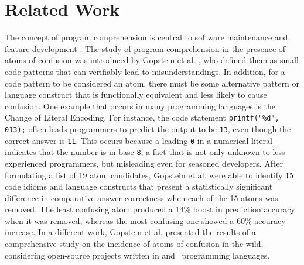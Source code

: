 
\section{Related Work}

\label{back}

The concept of program comprehension is central to software maintenance and feature development \cite{DBLP:conf/iwpc/TilleySP96, DBLP:journals/ibmsj/OHareT94}. The study of program comprehension in the presence of atoms of confusion was introduced by Gopstein et al. \cite{DBLP:conf/msr/GopsteinZFC18}, who defined them as small code patterns that can verifiably lead to misunderstandings. In addition, for a code pattern to be considered an atom, there must be some alternative pattern or language construct that is functionally equivalent and less likely to cause confusion. One example that occurs in many programming languages is the Change of Literal Encoding. For instance, the \clang code statement \lstinline{printf("%d", 013);} 
often leads programmers to predict the output to be \texttt{13}, even though the correct answer is \texttt{11}. This occurs because a leading \texttt{0} in a numerical literal indicates that the number is in base \texttt{8}, a fact that is not only unknown to less experienced programmers, but misleading even for seasoned developers. After formulating a list of 19 atom candidates, Gopstein et al. \cite{DBLP:conf/sigsoft/GopsteinIYDZYC17} were able to identify 15 code idioms and language constructs that present a statistically significant difference in comparative answer correctness when each of the 15 atoms was removed. The least confusing atom produced a 14\% boost in prediction accuracy when it was removed, whereas the most confusing one showed a 60\% accuracy increase. In a different work, Gopstein et al. \cite{DBLP:conf/msr/GopsteinZFC18} presented the results of a comprehensive study on the incidence of atoms of confusion in the wild, considering open-source projects written in \clang and \cpplang~programming languages.


